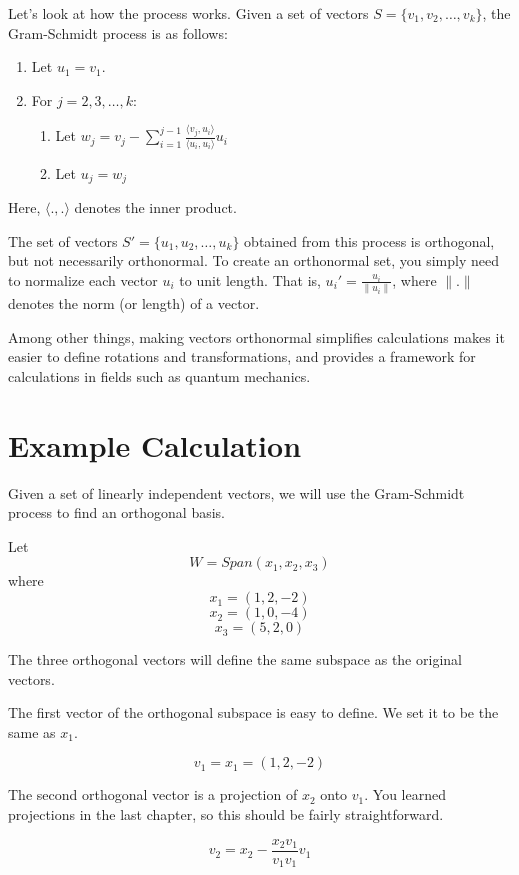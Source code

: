 Let's look at how the process works. Given a set of vectors $S = \{v_1, v_2, \ldots, v_k\}$, the Gram-Schmidt process is as follows:

\begin{enumerate}
    \item Let $u_1 = v_1$.
    \item For $j = 2, 3, \ldots, k$:
    \begin{enumerate}
        \item Let $w_j = v_j - \sum_{i=1}^{j-1} \frac{\langle v_j, u_i \rangle}{\langle u_i, u_i \rangle} u_i$
        \item Let $u_j = w_j$
    \end{enumerate}
\end{enumerate}

Here, $\langle . , . \rangle$ denotes the inner product. 

The set of vectors $S' = \{u_1, u_2, \ldots, u_k\}$ obtained from this
process is orthogonal, but not necessarily orthonormal. To create
an orthonormal set, you simply need to normalize each vector $u_i$ to
unit length. That is, $u_i' = \frac{u_i}{\|u_i\|}$, where $\|.\|$
denotes the norm (or length) of a vector.

Among other things, making vectors orthonormal simplifies calculations makes it easier to define rotations and transformations, and provides a framework for calculations in fields such as quantum mechanics.

\section{Example Calculation}

Given a set of linearly independent vectors, we will use the Gram-Schmidt process to find an orthogonal basis.

Let $$W = Span (x_1, x_2, x_3)$$ where
$$x_1 = (1, 2, -2) $$
$$x_2 = (1,0,-4) $$
$$x_3 = (5,2,0)$$

The three orthogonal vectors will define the same subspace as the original vectors. 

The first vector of the orthogonal subspace is easy to define. We set it to be the same as $x_1$.

$$v_1 = x_1 = (1, 2, -2)$$

The second orthogonal vector is a projection of $x_2$ onto $v_1$. You learned projections in the last chapter, so this should be fairly straightforward.

$$v_2 = x_2 - \frac{x_2v_1}{v_1v_1} v_1$$

